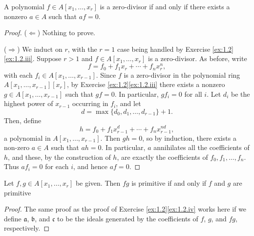 \begin{claim}
\label{claim:1.3.iii}
A polynomial $f\in A[x_1,\ldots,x_r]$ is a zero-divisor if and only if there exists a nonzero $a \in A$ such that $a f = 0$.
\end{claim}

\begin{proof}
($\Leftarrow$)
Nothing to prove.

($\Rightarrow$)
We induct on $r$, with the $r=1$ case being handled by Exercise \ref{ex:1.2}\ref{ex:1.2.iii}.
Suppose $r > 1$ and $f \in A[x_1,\ldots,x_r]$ is a zero-divisor.
As before, write
\begin{equation*}
f = f_0 + f_1 x_r + \cdots + f_n x_r^n,
\end{equation*}
with each $f_i \in A[x_1,\ldots,x_{r-1}]$.
Since $f$ is a zero-divisor in the polynomial ring $A[x_1,\ldots,x_{r-1}][x_r]$, by Exercise \ref{ex:1.2}\ref{ex:1.2.iii} there exists a nonzero $g \in A[x_1,\ldots,x_{r-1}]$ such that $g f = 0$.
In particular, $g f_i = 0$ for all $i$.
Let $d_i$ be the highest power of $x_{r-1}$ occurring in $f_i$, and let
\begin{equation*}
d = \max\{d_0,d_1,\ldots,d_{r-1}\}+1.
\end{equation*}
Then, define
\begin{equation*}
h
= f_0 + f_1 x_{r-1}^d + \cdots + f_n x_{r-1}^{nd},
\end{equation*}
a polynomial in $A[x_1,\ldots,x_{r-1}]$.
Then $g h = 0$, so by induction, there exists a non-zero $a \in A$ such that $a h = 0$.
In particular, $a$ annihilates all the coefficients of $h$, and these, by the construction of $h$, are exactly the coefficients of $f_0,f_1,\ldots,f_n$.
Thus $a f_i = 0$ for each $i$, and hence $a f = 0$.
\end{proof}

\begin{claim}
\label{claim:1.3.iv}
Let $f,g\in A[x_1,\ldots,x_r]$ be given.
Then $f g$ is primitive if and only if $f$ and $g$ are primitive
\end{claim}

\begin{proof}
The same proof as the proof of Exercise \ref{ex:1.2}\ref{ex:1.2.iv} works here if we define $\mathfrak a$, $\mathfrak b$, and $\mathfrak c$ to be the ideals generated by the coefficients of $f$, $g$, and $f g$, respectively.
\end{proof}







